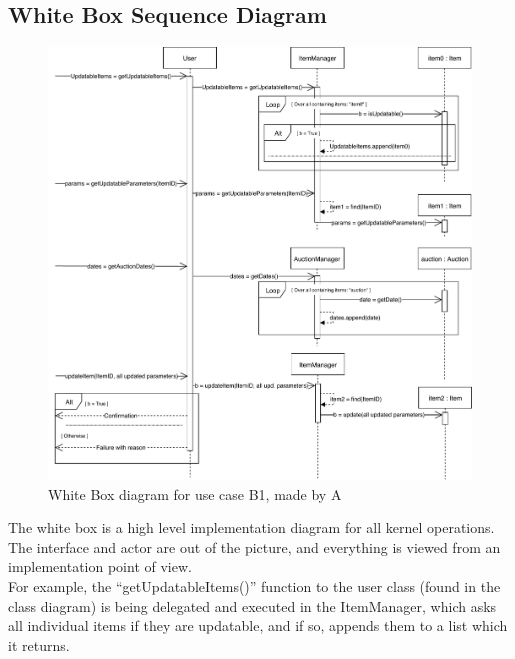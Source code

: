 \subsection*{White Box Sequence Diagram}
\begin{figure}[H]
	\centering
	\includegraphics[scale=.85]{uml/SD-wb-update.pdf}
	\caption*{White Box diagram for use case B1, made by A}
\end{figure}
The white box is a high level implementation diagram for all kernel operations. The interface and actor are out of the picture, and everything is viewed from an implementation point of view.\\For example, the ``getUpdatableItems()'' function to the user class (found in the class diagram) is being delegated and executed in the ItemManager, which asks all individual items if they are updatable, and if so, appends them to a list which it returns.